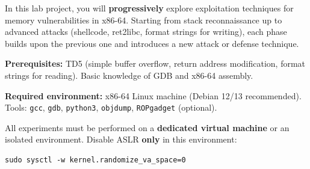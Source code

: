 \documentclass[a4paper,11pt]{article}
\theoremstyle{plain}
\theoremstyle{definition}
\begin{document}
\noindent
In this lab project, you will \textbf{progressively} explore exploitation techniques for memory vulnerabilities in x86-64. Starting from stack reconnaissance up to advanced attacks (shellcode, ret2libc, format strings for writing), each phase builds upon the previous one and introduces a new attack or defense technique.

\medskip
\noindent\textbf{Prerequisites:} TD5 (simple buffer overflow, return address modification, format strings for reading). Basic knowledge of GDB and x86-64 assembly.

\medskip
\noindent\textbf{Required environment:} x86-64 Linux machine (Debian 12/13 recommended). Tools: \texttt{gcc}, \texttt{gdb}, \texttt{python3}, \texttt{objdump}, \texttt{ROPgadget} (optional).

\bigskip

\begin{attention}
All experiments must be performed on a \textbf{dedicated virtual machine} or an isolated environment. Disable ASLR \textbf{only} in this environment:
\begin{lstlisting}[style=GDBStyle]
sudo sysctl -w kernel.randomize_va_space=0
\end{lstlisting}
\end{attention}

\bigskip

\end{document}

